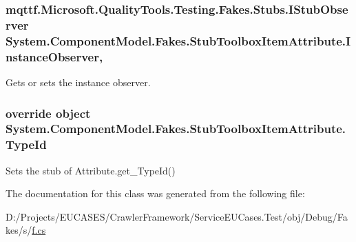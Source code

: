 \hypertarget{class_system_1_1_component_model_1_1_fakes_1_1_stub_toolbox_item_attribute_aeb346d39469f56606d872500f7ca1a5f}{
\subsubsection[{Instance\-Observer}]{\setlength{\rightskip}{0pt plus 5cm}mqttf.\-Microsoft.\-Quality\-Tools.\-Testing.\-Fakes.\-Stubs.\-I\-Stub\-Observer System.\-Component\-Model.\-Fakes.\-Stub\-Toolbox\-Item\-Attribute.\-Instance\-Observer\hspace{0.3cm}{\ttfamily [get]}, {\ttfamily [set]}}}\label{class_system_1_1_component_model_1_1_fakes_1_1_stub_toolbox_item_attribute_aeb346d39469f56606d872500f7ca1a5f}


Gets or sets the instance observer.

\hypertarget{class_system_1_1_component_model_1_1_fakes_1_1_stub_toolbox_item_attribute_ace50a149835e6c47239d4a9aa28d9376}{
\subsubsection[{Type\-Id}]{\setlength{\rightskip}{0pt plus 5cm}override object System.\-Component\-Model.\-Fakes.\-Stub\-Toolbox\-Item\-Attribute.\-Type\-Id\hspace{0.3cm}{\ttfamily [get]}}}\label{class_system_1_1_component_model_1_1_fakes_1_1_stub_toolbox_item_attribute_ace50a149835e6c47239d4a9aa28d9376}


Sets the stub of Attribute.\-get\-\_\-\-Type\-Id()



The documentation for this class was generated from the following file\-:\begin{DoxyCompactItemize}
\item 
D\-:/\-Projects/\-E\-U\-C\-A\-S\-E\-S/\-Crawler\-Framework/\-Service\-E\-U\-Cases.\-Test/obj/\-Debug/\-Fakes/s/\hyperlink{s_2f_8cs}{f.\-cs}\end{DoxyCompactItemize}
